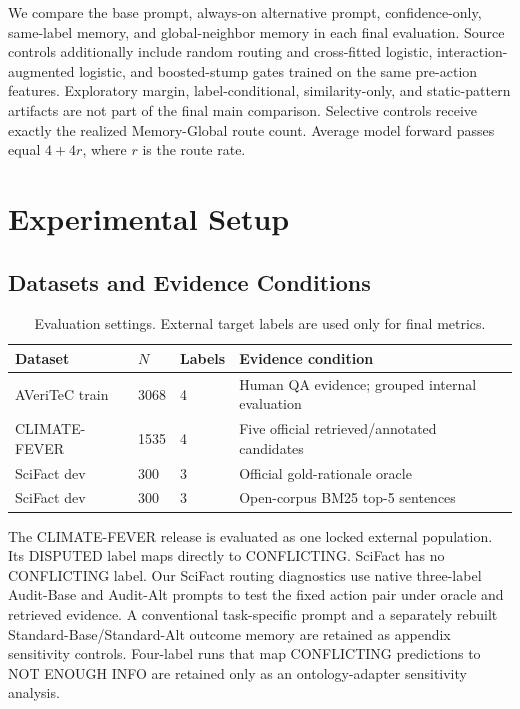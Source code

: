 \documentclass[runningheads]{llncs}
\begin{document}
We compare the base prompt, always-on alternative prompt, confidence-only,
same-label memory, and global-neighbor memory in each final evaluation.
Source controls additionally include random routing and cross-fitted
logistic, interaction-augmented logistic, and boosted-stump gates trained on
the same pre-action features. Exploratory margin, label-conditional,
similarity-only, and static-pattern artifacts are not part of the final
main comparison.
Selective controls receive exactly the realized Memory-Global route count. Average model forward
passes equal $4+4r$, where $r$ is the route rate.

\section{Experimental Setup}

\subsection{Datasets and Evidence Conditions}

\begin{table}[t]
\caption{Evaluation settings. External target labels are used only for final
metrics.}
\label{tab:settings}
\centering
\small
\begin{tabular}{llll}
\toprule
Dataset & $N$ & Labels & Evidence condition \\
\midrule
AVeriTeC train & 3068 & 4 & Human QA evidence; grouped internal evaluation \\
CLIMATE-FEVER & 1535 & 4 & Five official retrieved/annotated candidates \\
SciFact dev & 300 & 3 & Official gold-rationale oracle \\
SciFact dev & 300 & 3 & Open-corpus BM25 top-5 sentences \\
\bottomrule
\end{tabular}
\end{table}

The CLIMATE-FEVER release is evaluated as one locked external population. Its
DISPUTED label maps directly to CONFLICTING. SciFact has no CONFLICTING label.
Our SciFact routing diagnostics use native three-label Audit-Base and
Audit-Alt prompts to test the fixed action pair under oracle and retrieved evidence.
A conventional task-specific prompt and a separately rebuilt
Standard-Base/Standard-Alt outcome memory are retained as appendix sensitivity controls.
Four-label runs that map CONFLICTING
predictions to NOT ENOUGH INFO are retained only as an ontology-adapter
sensitivity analysis.
\end{document}
